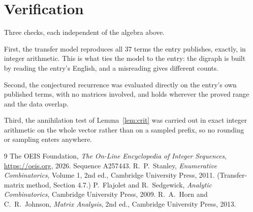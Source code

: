 \documentclass[11pt,a4paper]{article}
\theoremstyle{plain}
\theoremstyle{definition}
\begin{document}
\section{Verification}

Three checks, each independent of the algebra above.

First, the transfer model reproduces all $37$ terms the entry publishes, exactly, in
integer arithmetic. This is what ties the model to the entry: the digraph is built by reading
the entry's English, and a misreading gives different counts.

Second, the conjectured recurrence was evaluated directly on the entry's own published terms,
with no matrices involved, and holds wherever the proved range and the data overlap.

Third, the annihilation test of Lemma~\ref{lem:crit} was carried out in exact integer
arithmetic on the whole vector rather than on a sampled prefix, so no rounding or sampling
enters anywhere.

\begin{thebibliography}{9}
 The OEIS Foundation, \emph{The On-Line Encyclopedia of Integer
Sequences}, \url{https://oeis.org}, 2026. Sequence A257443.
 R.~P.~Stanley, \emph{Enumerative Combinatorics}, Volume 1, 2nd ed.,
Cambridge University Press, 2011. (Transfer-matrix method, Section 4.7.)
 P.~Flajolet and R.~Sedgewick, \emph{Analytic Combinatorics}, Cambridge
University Press, 2009.
 R.~A.~Horn and C.~R.~Johnson, \emph{Matrix Analysis}, 2nd ed., Cambridge
University Press, 2013.
\end{thebibliography}
\end{document}
